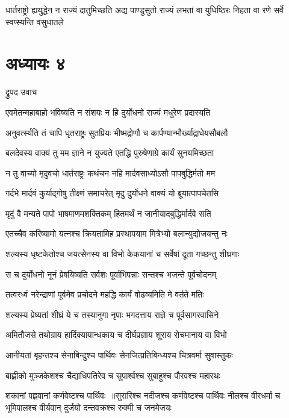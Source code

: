 \threelineshloka
{धार्तराष्ट्रो ह्ययुद्धेन न राज्यं दातुमिच्छति}
{अद्य पाण्डुसुतो राज्यं लभतां वा युधिष्ठिरः}
{निहता वा रणे सर्वे स्वप्स्यन्ति वसुधातले}


\chapter{अध्यायः ४}
\twolineshloka
{द्रुपद उवाच}
{}


\twolineshloka
{एवमेतन्महाबाहो भविष्यति न संशयः}
{न हि दुर्योधनो राज्यं मधुरेण प्रदास्यति}


\twolineshloka
{अनुवर्त्स्यति तं चापि धृतराष्ट्रः सुतप्रियः}
{भीष्मद्रोणौ च कार्पण्यान्मौर्ख्याद्राधेयसौबलौ}


\twolineshloka
{बलदेवस्य वाक्यं तु मम ज्ञाने न युज्यते}
{एतद्धि पुरुषेणाग्रे कार्यं सुनयमिच्छता}


\twolineshloka
{न तु वाच्यो मृदुवचो धार्तराष्ट्रः कथंचन}
{नहि मार्दवसाध्योऽसौ पापबुद्धिर्मतो मम}


\twolineshloka
{गर्दभे मार्दवं कुर्याद्गोषु तीक्ष्णं समाचरेत्}
{मृदु दुर्योधने वाक्यं यो ब्रूयात्पापचेतसि}


\twolineshloka
{मृदुं वै मन्यते पापो भाषमाणमशक्तिकम्}
{हितमर्थं न जानीयादबुद्धिर्मार्दवे सति}


\twolineshloka
{एतच्चैव करिष्यामो यत्नश्च क्रियतामिह}
{प्रस्थापयाम मित्रेभ्यो बलान्युद्योजयन्तु नः}


\twolineshloka
{शल्यस्य धृष्टकेतोश्च जयत्सेनस्य वा विभो}
{केकयानां च सर्वेषां दूता गच्छन्तु शीघ्रगाः}


\twolineshloka
{स च दुर्योधनो नूनं प्रेषयिष्यति सर्वशः}
{पूर्वाभिपन्नाः सन्तश्च भजन्ते पूर्वचोदनम्}


\twolineshloka
{तत्वरध्वं नरेन्द्राणां पूर्वमेव प्रचोदने}
{महद्धि कार्यं वोढव्यमिति मे वर्तते मतिः}


\twolineshloka
{शल्यस्य प्रेष्यतां शीघ्रं ये च तस्यानुगा नृपाः}
{भगदत्ताय राज्ञे च पूर्वसागरवासिने}


\twolineshloka
{अमितौजसे तथोग्राय हार्दिक्यायान्धकाय च}
{दीर्घप्रज्ञाय शूराय रोचमानाय वा विभो}


\twolineshloka
{आनीयतां बृहन्तश्च सेनाबिन्दुश्च पार्थिवः}
{सेनजित्प्रतिबिन्ध्यश्च चित्रवर्मा सुवास्तुकः}


\twolineshloka
{बाह्लीको मुञ्जकेशश्च चैद्याधिपतिरेव च}
{सुपार्श्वश्च सुबाहुश्च पौरवश्च महारथः}


शकानां पह्लवानां कर्णवेष्टश्च पार्थिवः ॥सुरारिश्च नदीजश्च कर्णवेष्टश्च पार्थिवः
\twolineshloka
{नीलश्च वीरधर्मा च भूमिपालश्च वीर्यवान्}
{दुर्जयो दन्तवक्रश्च रुक्मी च जनमेजयः}


